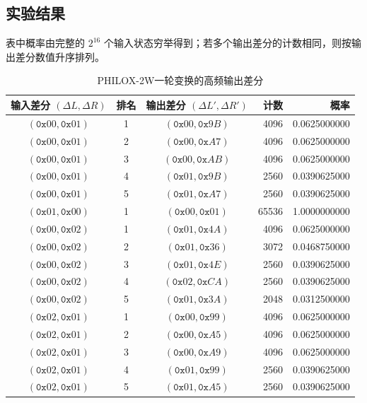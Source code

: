 \subsection{实验结果}

表中概率由完整的 $2^{16}$ 个输入状态穷举得到；若多个输出差分的计数相同，则按输出差分数值升序排列。

\begin{table}[H]
    \centering
    \small
    \caption{PHILOX-2W一轮变换的高频输出差分}
    \label{tab:task5_top_differences}
    \renewcommand{\arraystretch}{1.1}
    \begin{tabular}{cccrr}
        \toprule
        输入差分 $(\Delta L,\Delta R)$ & 排名 & 输出差分 $(\Delta L',\Delta R')$ & 计数 & 概率 \\
        \midrule
        $(\texttt{0x}00,\texttt{0x}01)$ & 1 & $(\texttt{0x}00,\texttt{0x}9B)$ & 4096 & 0.0625000000 \\
        $(\texttt{0x}00,\texttt{0x}01)$ & 2 & $(\texttt{0x}00,\texttt{0x}A7)$ & 4096 & 0.0625000000 \\
        $(\texttt{0x}00,\texttt{0x}01)$ & 3 & $(\texttt{0x}00,\texttt{0x}AB)$ & 4096 & 0.0625000000 \\
        $(\texttt{0x}00,\texttt{0x}01)$ & 4 & $(\texttt{0x}01,\texttt{0x}9B)$ & 2560 & 0.0390625000 \\
        $(\texttt{0x}00,\texttt{0x}01)$ & 5 & $(\texttt{0x}01,\texttt{0x}A7)$ & 2560 & 0.0390625000 \\
        \midrule
        $(\texttt{0x}01,\texttt{0x}00)$ & 1 & $(\texttt{0x}00,\texttt{0x}01)$ & 65536 & 1.0000000000 \\
        \midrule
        $(\texttt{0x}00,\texttt{0x}02)$ & 1 & $(\texttt{0x}01,\texttt{0x}4A)$ & 4096 & 0.0625000000 \\
        $(\texttt{0x}00,\texttt{0x}02)$ & 2 & $(\texttt{0x}01,\texttt{0x}36)$ & 3072 & 0.0468750000 \\
        $(\texttt{0x}00,\texttt{0x}02)$ & 3 & $(\texttt{0x}01,\texttt{0x}4E)$ & 2560 & 0.0390625000 \\
        $(\texttt{0x}00,\texttt{0x}02)$ & 4 & $(\texttt{0x}02,\texttt{0x}CA)$ & 2560 & 0.0390625000 \\
        $(\texttt{0x}00,\texttt{0x}02)$ & 5 & $(\texttt{0x}01,\texttt{0x}3A)$ & 2048 & 0.0312500000 \\
        \midrule
        $(\texttt{0x}02,\texttt{0x}01)$ & 1 & $(\texttt{0x}00,\texttt{0x}99)$ & 4096 & 0.0625000000 \\
        $(\texttt{0x}02,\texttt{0x}01)$ & 2 & $(\texttt{0x}00,\texttt{0x}A5)$ & 4096 & 0.0625000000 \\
        $(\texttt{0x}02,\texttt{0x}01)$ & 3 & $(\texttt{0x}00,\texttt{0x}A9)$ & 4096 & 0.0625000000 \\
        $(\texttt{0x}02,\texttt{0x}01)$ & 4 & $(\texttt{0x}01,\texttt{0x}99)$ & 2560 & 0.0390625000 \\
        $(\texttt{0x}02,\texttt{0x}01)$ & 5 & $(\texttt{0x}01,\texttt{0x}A5)$ & 2560 & 0.0390625000 \\
        \bottomrule
    \end{tabular}
\end{table}

